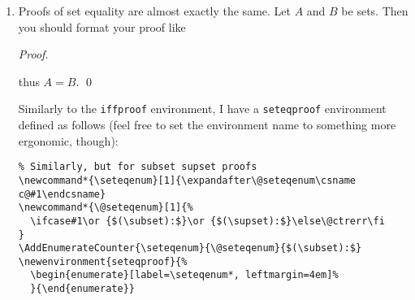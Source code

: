 \documentclass{fkpset}
\begin{document}
\begin{enumerate}[label=(\arabic*)]
\begin{lstlisting}
\AddEnumerateCounter{\iffenum}{\@iffenum}{$(\Rightarrow):$}
\newenvironment{iffproof}{%
  \begin{enumerate}[label=\iffenum*, leftmargin=4em]%
  }{\end{enumerate}}\end{lstlisting}\vspace{-3em}
  With this, creating the iff portion of the proof above was as simple as
  \begin{lstlisting}
\begin{iffproof}
  \item Suppose $A$. Then [\ldots lots of math happening here!\ \ldots], hence
    $B$. \cmark
  \item Suppose $B$. Then [\ldots also lots of math happening here! \ldots],
    therefore $A$.
\end{iffproof}\end{lstlisting}\vspace{-3em}
  Where \verb|\cmark| requires the \texttt{pifont} package and is defined
  by\\
  \verb|\newcommand{\cmark}{\text{\ding{51}}}|.
\item Proofs of set equality are almost exactly the same. Let $A$ and $B$ be
  sets. Then you should format your proof like
  \begin{leftbar}
    \emph{Proof.}
    thus $A = B$. \qed
  \end{leftbar}
  Similarly to the \texttt{iffproof} environment, I have a
  \texttt{seteqproof} environment defined as follows (feel free to set the
  environment name to something more ergonomic, though):
  \begin{lstlisting}
% Similarly, but for subset supset proofs
\newcommand*{\seteqenum}[1]{\expandafter\@seteqenum\csname c@#1\endcsname}
\newcommand*{\@seteqenum}[1]{%
  \ifcase#1\or {$(\subset):$}\or {$(\supset):$}\else\@ctrerr\fi
}
\AddEnumerateCounter{\seteqenum}{\@seteqenum}{$(\subset):$}
\newenvironment{seteqproof}{%
  \begin{enumerate}[label=\seteqenum*, leftmargin=4em]%
  }{\end{enumerate}}\end{lstlisting}\vspace{-3em}

\end{enumerate}
\end{document}
